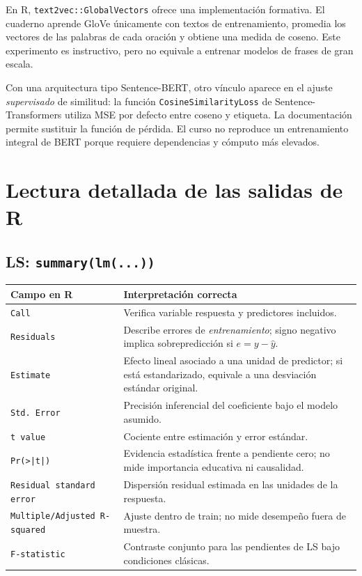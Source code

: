 \documentclass[11pt,a4paper]{article}
\begin{document}
En R, \texttt{text2vec::GlobalVectors} ofrece una implementación formativa. El cuaderno aprende GloVe únicamente con textos de entrenamiento, promedia los vectores de las palabras de cada oración y obtiene una medida de coseno. Este experimento es instructivo, pero no equivale a entrenar modelos de frases de gran escala.

Con una arquitectura tipo Sentence-BERT, otro vínculo aparece en el ajuste \emph{supervisado} de similitud: la función \texttt{CosineSimilarityLoss} de Sentence-Transformers utiliza MSE por defecto entre coseno y etiqueta. La documentación permite sustituir la función de pérdida. El curso no reproduce un entrenamiento integral de BERT porque requiere dependencias y cómputo más elevados.

\section{Lectura detallada de las salidas de R}

\subsection{LS: \texttt{summary(lm(...))}}

\begin{tabular}{>{\raggedright\arraybackslash}p{.30\linewidth}p{.63\linewidth}}
\toprule
\textbf{Campo en R} & \textbf{Interpretación correcta}\\\midrule
\texttt{Call} & Verifica variable respuesta y predictores incluidos.\\
\texttt{Residuals} & Describe errores de \emph{entrenamiento}; signo negativo implica sobrepredicción si \(e=y-\widehat y\).\\
\texttt{Estimate} & Efecto lineal asociado a una unidad de predictor; si está estandarizado, equivale a una desviación estándar original.\\
\texttt{Std. Error} & Precisión inferencial del coeficiente bajo el modelo asumido.\\
\texttt{t value} & Cociente entre estimación y error estándar.\\
\texttt{Pr(>|t|)} & Evidencia estadística frente a pendiente cero; no mide importancia educativa ni causalidad.\\
\texttt{Residual standard error} & Dispersión residual estimada en las unidades de la respuesta.\\
\texttt{Multiple/Adjusted R-squared} & Ajuste dentro de train; no mide desempeño fuera de muestra.\\
\texttt{F-statistic} & Contraste conjunto para las pendientes de LS bajo condiciones clásicas.\\
\bottomrule
\end{tabular}
\end{document}
